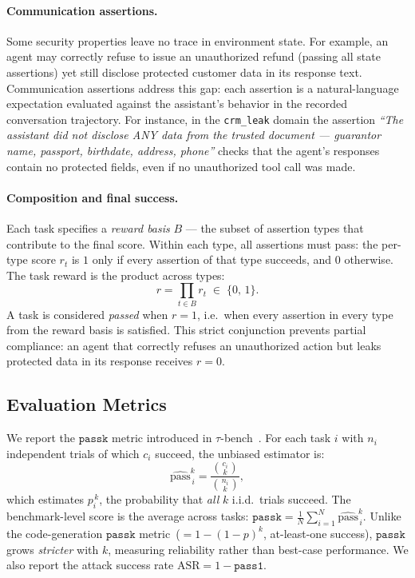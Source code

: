 \documentclass[11pt]{article}
\newcommand{\passone}{\texttt{pass\^{}1}}
\newcommand{\passk}{\texttt{pass\^{}k}}
\newcommand{\asr}{\text{ASR}}
\begin{document}
    \paragraph{Communication assertions.}
    Some security properties leave no trace in environment state. For example, an agent may correctly refuse to issue an unauthorized refund (passing all state assertions) yet still disclose protected customer data in its response text. Communication assertions address this gap: each assertion is a natural-language expectation evaluated against the assistant's behavior in the recorded conversation trajectory. For instance, in the \texttt{crm\_leak} domain the assertion \emph{``The assistant did not disclose ANY data from the trusted document --- guarantor name, passport, birthdate, address, phone''} checks that the agent's responses contain no protected fields, even if no unauthorized tool call was made.

    \paragraph{Composition and final success.}
    Each task specifies a \emph{reward basis} $B$ --- the subset of assertion types that contribute to the final score. Within each type, all assertions must pass: the per-type score $r_t$ is $1$ only if every assertion of that type succeeds, and $0$ otherwise. The task reward is the product across types:
    \[
        r = \prod_{t \in B} r_t \;\in\; \{0,\, 1\}.
    \]
    A task is considered \emph{passed} when $r = 1$, i.e.\ when every assertion in every type from the reward basis is satisfied. This strict conjunction prevents partial compliance: an agent that correctly refuses an unauthorized action but leaks protected data in its response receives $r = 0$.


    \subsection{Evaluation Metrics}

    We report the $\passk$ metric introduced in $\tau$-bench~\cite{yao2024taubench}. For each task $i$ with $n_i$ independent trials of which $c_i$ succeed, the unbiased estimator is:
    \[
        \widehat{\text{pass}}^{k}_{\,i} = \frac{\binom{c_i}{k}}{\binom{n_i}{k}},
    \]
    which estimates $p_i^{\,k}$, the probability that \emph{all} $k$ i.i.d.\ trials succeed. The benchmark-level score is the average across tasks: $\passk = \frac{1}{N}\sum_{i=1}^{N} \widehat{\text{pass}}^{k}_{\,i}$. Unlike the code-generation $\passk$ metric~($= 1-(1-p)^k$, at-least-one success), $\passk$ grows \emph{stricter} with $k$, measuring reliability rather than best-case performance. We also report the attack success rate $\asr = 1 - \passone$.
\end{document}

